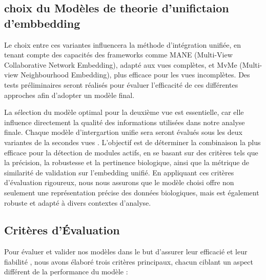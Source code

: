 \begin{enumerate}
    \end{enumerate}

\subsection{choix du Modèles de theorie d'unifictaion d'embbedding }
Le choix entre ces variantes influencera la méthode d'intégration unifiée, en tenant compte des capacités des frameworks comme MANE (Multi-View Collaborative Network Embedding), adapté aux vues complètes, et MvMe (Multi-view Neighbourhood Embedding), plus efficace pour les vues incomplètes. Des tests préliminaires seront réalisés pour évaluer l'efficacité de ces différentes approches afin d'adopter un modèle final.

La sélection du modèle optimal pour la deuxième vue est essentielle, car elle influence directement la qualité des informations utilisées dans notre analyse finale. Chaque modèle d'intergartion unifie sera   seront évalués sous les deux variantes de la secondes vues . L'objectif est de déterminer la combinaison la plus efficace pour la détection de modules actifs, en se basant sur des critères tels que la précision, la robustesse et la pertinence biologique, ainsi que la métrique de similarité de validation sur l'embedding unifié. En appliquant ces critères d'évaluation rigoureux, nous nous assurons que le modèle choisi offre non seulement une représentation précise des données biologiques, mais est également robuste et adapté à divers contextes d'analyse.
 
\subsection{Critères d'Évaluation}

Pour évaluer et valider nos modèles dans le but d'assurer leur efficacié et leur fiabilité , nous avons élaboré trois critères principaux, chacun ciblant un aspect différent de la performance du modèle :


